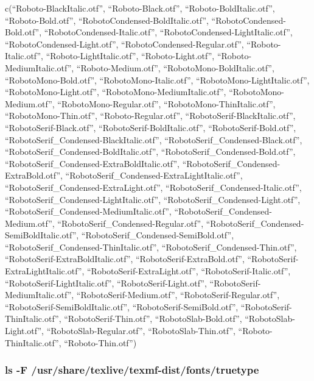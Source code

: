 \documentclass[
]{article}
\begin{document}
c(``Roboto-BlackItalic.otf'', ``Roboto-Black.otf'',
``Roboto-BoldItalic.otf'', ``Roboto-Bold.otf'',
``RobotoCondensed-BoldItalic.otf'', ``RobotoCondensed-Bold.otf'',
``RobotoCondensed-Italic.otf'', ``RobotoCondensed-LightItalic.otf'',
``RobotoCondensed-Light.otf'', ``RobotoCondensed-Regular.otf'',
``Roboto-Italic.otf'', ``Roboto-LightItalic.otf'', ``Roboto-Light.otf'',
``Roboto-MediumItalic.otf'', ``Roboto-Medium.otf'',
``RobotoMono-BoldItalic.otf'', ``RobotoMono-Bold.otf'',
``RobotoMono-Italic.otf'', ``RobotoMono-LightItalic.otf'',
``RobotoMono-Light.otf'', ``RobotoMono-MediumItalic.otf'',
``RobotoMono-Medium.otf'', ``RobotoMono-Regular.otf'',
``RobotoMono-ThinItalic.otf'', ``RobotoMono-Thin.otf'',
``Roboto-Regular.otf'', ``RobotoSerif-BlackItalic.otf'',
``RobotoSerif-Black.otf'', ``RobotoSerif-BoldItalic.otf'',
``RobotoSerif-Bold.otf'', ``RobotoSerif\_Condensed-BlackItalic.otf'',
``RobotoSerif\_Condensed-Black.otf'',
``RobotoSerif\_Condensed-BoldItalic.otf'',
``RobotoSerif\_Condensed-Bold.otf'',
``RobotoSerif\_Condensed-ExtraBoldItalic.otf'',
``RobotoSerif\_Condensed-ExtraBold.otf'',
``RobotoSerif\_Condensed-ExtraLightItalic.otf'',
``RobotoSerif\_Condensed-ExtraLight.otf'',
``RobotoSerif\_Condensed-Italic.otf'',
``RobotoSerif\_Condensed-LightItalic.otf'',
``RobotoSerif\_Condensed-Light.otf'',
``RobotoSerif\_Condensed-MediumItalic.otf'',
``RobotoSerif\_Condensed-Medium.otf'',
``RobotoSerif\_Condensed-Regular.otf'',
``RobotoSerif\_Condensed-SemiBoldItalic.otf'',
``RobotoSerif\_Condensed-SemiBold.otf'',
``RobotoSerif\_Condensed-ThinItalic.otf'',
``RobotoSerif\_Condensed-Thin.otf'',
``RobotoSerif-ExtraBoldItalic.otf'', ``RobotoSerif-ExtraBold.otf'',
``RobotoSerif-ExtraLightItalic.otf'', ``RobotoSerif-ExtraLight.otf'',
``RobotoSerif-Italic.otf'', ``RobotoSerif-LightItalic.otf'',
``RobotoSerif-Light.otf'', ``RobotoSerif-MediumItalic.otf'',
``RobotoSerif-Medium.otf'', ``RobotoSerif-Regular.otf'',
``RobotoSerif-SemiBoldItalic.otf'', ``RobotoSerif-SemiBold.otf'',
``RobotoSerif-ThinItalic.otf'', ``RobotoSerif-Thin.otf'',
``RobotoSlab-Bold.otf'', ``RobotoSlab-Light.otf'',
``RobotoSlab-Regular.otf'', ``RobotoSlab-Thin.otf'',
``Roboto-ThinItalic.otf'', ``Roboto-Thin.otf'')

\hypertarget{ls--f-usrsharetexlivetexmf-distfontstruetype}{%
\subsubsection{ls -F
/usr/share/texlive/texmf-dist/fonts/truetype}\label{ls--f-usrsharetexlivetexmf-distfontstruetype}}
\end{document}
